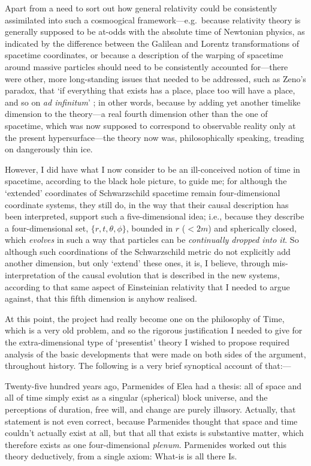 Apart from a need to sort out how general relativity could be consistently assimilated into such a cosmoogical framework---e.g.~because relativity theory is generally supposed to be at-odds with the absolute time of Newtonian physics, as indicated by the difference between the Galilean and Lorentz transformations of spacetime coordinates, or because a description of the warping of spacetime around massive particles should need to be consistently accounted for---there were other, more long-standing issues that needed to be addressed, such as Zeno's paradox, that `if everything that exists has a place, place too will have a place, and so on 
\textit{ad infinitum}' \cite{Aristotle1984}; in other words, because by adding yet another timelike dimension to the theory---a real fourth dimension other than the one of spacetime, which was now supposed to correspond to observable reality only at the present hypersurface---the theory now was, philosophically speaking, treading on dangerously thin ice.

However, I did have what I now consider to be an ill-conceived notion of time in spacetime, according to the black hole picture, to guide me; for although the `extended' coordinates of Schwarzschild spacetime remain four-dimensional coordinate systems, they still do, in the way that their causal description has been interpreted, support such a five-dimensional idea; i.e., because they describe a four-dimensional set, $\{r,t,\theta,\phi\}$, bounded in $r$ ($<2m$) and spherically closed, which \textit{evolves} in such a way that particles can be \textit{continually dropped into it}. So although such coordinations of the Schwarzschild metric do not explicitly add another dimension, but only `extend' these ones, it is, I believe, through mis-interpretation of the causal evolution that is described in the new systems, according to that same aspect of Einsteinian relativity that I needed to argue against, that this fifth dimension is anyhow realised.

At this point, the project had really become one on the philosophy of Time, which is a very old problem, and so the rigorous justification I needed to give for the extra-dimensional type of `presentist' theory I wished to propose required analysis of the basic developments that were made on both sides of the argument, throughout history. The following is a very brief synoptical account of that:---

Twenty-five hundred years ago, Parmenides of Elea had a thesis: all of space and all of time simply exist as a singular (spherical) block universe, and the perceptions of duration, free will, and change are purely illusory. Actually, that statement is not even correct, because Parmenides thought that space and time couldn't actually exist at all, but that all that exists is substantive matter, which therefore exists as one four-dimensional \textit{plenum}. Parmenides worked out this theory deductively, from a single axiom: What-is is all there Is.

